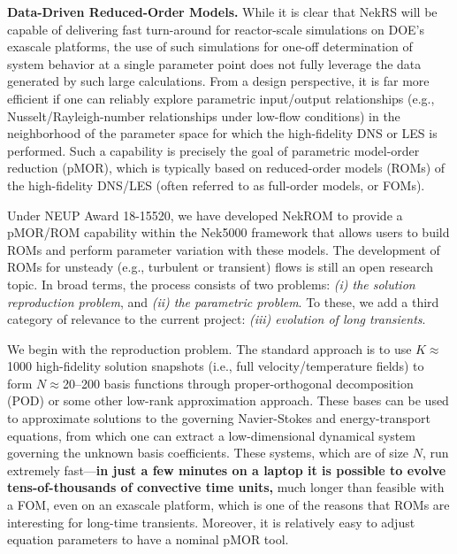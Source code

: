 \noindent
{\bf Data-Driven Reduced-Order Models.}
While it is clear that NekRS will be capable of delivering fast turn-around
for reactor-scale simulations on DOE's exascale platforms, the use of
such simulations for one-off determination of system behavior at a single
parameter point does not fully leverage the data generated by such large
calculations.
From a design perspective, it is far more efficient if one can reliably
explore parametric input/output relationships (e.g., Nusselt/Rayleigh-number
relationships under low-flow conditions) in the neighborhood of the parameter
space for which the high-fidelity DNS or LES is performed.   Such a capability
is precisely the goal of parametric model-order reduction (pMOR), which is
typically based on reduced-order models (ROMs) of the high-fidelity DNS/LES
(often referred to as full-order models, or FOMs).

Under NEUP Award 18-15520, we have developed NekROM to provide a
pMOR/ROM capability within the Nek5000 framework that allows users to build
ROMs and perform parameter variation with these models.  The development of
ROMs for unsteady (e.g., turbulent or transient) flows is still an open
research topic.  In broad terms, the process consists of two problems: {\em (i)
the solution reproduction problem}, and {\em (ii) the parametric problem}.  To
these, we add a third category of relevance to the current project: {\em (iii)
evolution of long transients}.

We begin with the reproduction problem. The standard approach is to use
$K$$\approx$1000 high-fidelity solution snapshots (i.e., full velocity/temperature
fields) to form $N$$\approx$20--200 basis functions through
proper-orthogonal decomposition (POD) or some other low-rank approximation
approach.  These bases can be used to approximate solutions to the governing
Navier-Stokes and energy-transport equations, from which one can extract a
low-dimensional dynamical system governing the unknown basis coefficients.
These systems, which are of size $N$, run extremely fast---{\bf in just a few
minutes on a laptop it is possible to evolve tens-of-thousands of convective
time units,} much longer than feasible with a FOM, even on an exascale platform,
which is one of the reasons that ROMs are interesting for long-time transients.
Moreover, it is relatively easy to adjust equation parameters to have a nominal
pMOR tool.

